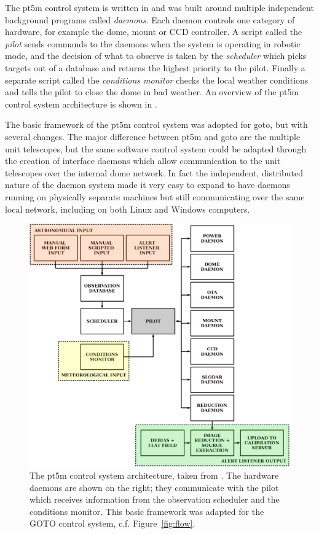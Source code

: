 \begin{colsection}
\begin{colsection}
The \gls{pt5m} control system is written in  and was built around multiple independent background programs called \emph{daemons}. Each daemon controls one category of hardware, for example the dome, mount or CCD controller. A script called the \emph{pilot} sends commands to the daemons when the system is operating in robotic mode, and the decision of what to observe is taken by the \emph{scheduler} which picks targets out of a database and returns the highest priority to the pilot. Finally a separate script called the \emph{conditions monitor} checks the local weather conditions and tells the pilot to close the dome in bad weather. An overview of the pt5m control system architecture is shown in .

The basic framework of the pt5m control system was adopted for \gls{goto}, but with several changes. The major difference between \gls{pt5m} and \gls{goto} are the multiple unit telescopes, but the same software control system could be adapted through the creation of interface daemons which allow communication to the unit telescopes over the internal dome network. In fact the independent, distributed nature of the daemon system made it very easy to expand to have daemons running on physically separate machines but still communicating over the same local network, including on both Linux and Windows computers.

\begin{figure}[p]
\begin{center}
\includegraphics[width=\linewidth]{images/pt5m_software.png}
\end{center}
\caption[The pt5m control system architecture]{The \gls{pt5m} control system architecture, taken from \citet{pt5m}. The hardware daemons are shown on the right; they communicate with the pilot which receives information from the observation scheduler and the conditions monitor. This basic framework was adapted for the GOTO control system, c.f. Figure~\ref{fig:flow}.}
\label{fig:pt5m_software}
\end{figure}


\end{colsection}
\end{colsection}
